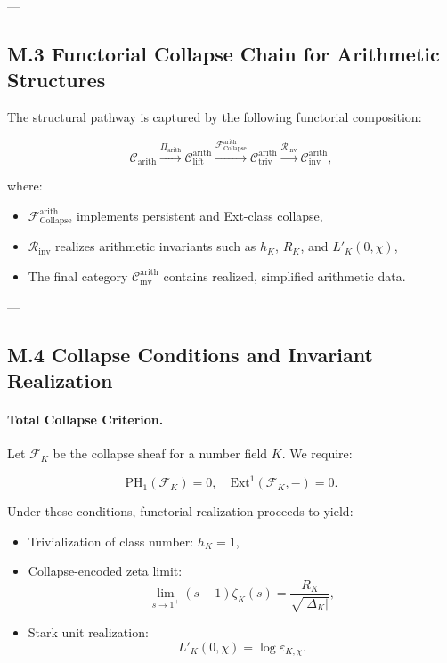\documentclass[11pt]{article}
\begin{document}
---

\subsection*{M.3 Functorial Collapse Chain for Arithmetic Structures}

The structural pathway is captured by the following functorial composition:

\[
\mathcal{C}_{\mathrm{arith}} 
\xrightarrow{\Pi_{\mathrm{arith}}} 
\mathcal{C}_{\mathrm{lift}}^{\mathrm{arith}} 
\xrightarrow{\mathcal{F}_{\mathrm{Collapse}}^{\mathrm{arith}}} 
\mathcal{C}_{\mathrm{triv}}^{\mathrm{arith}} 
\xrightarrow{\mathcal{R}_{\mathrm{inv}}} 
\mathcal{C}_{\mathrm{inv}}^{\mathrm{arith}},
\]

where:
\begin{itemize}
  \item \( \mathcal{F}_{\mathrm{Collapse}}^{\mathrm{arith}} \) implements persistent and Ext-class collapse,
  \item \( \mathcal{R}_{\mathrm{inv}} \) realizes arithmetic invariants such as \( h_K \), \( R_K \), and \( L'_K(0,\chi) \),
  \item The final category \( \mathcal{C}_{\mathrm{inv}}^{\mathrm{arith}} \) contains realized, simplified arithmetic data.
\end{itemize}

---

\subsection*{M.4 Collapse Conditions and Invariant Realization}

\paragraph{Total Collapse Criterion.}
Let \( \mathcal{F}_K \) be the collapse sheaf for a number field \( K \). We require:

\[
\mathrm{PH}_1(\mathcal{F}_K) = 0, \quad \mathrm{Ext}^1(\mathcal{F}_K, -) = 0.
\]

Under these conditions, functorial realization proceeds to yield:
\begin{itemize}
  \item Trivialization of class number: \( h_K = 1 \),
  \item Collapse-encoded zeta limit:
  \[
  \lim_{s \to 1^+} (s - 1)\zeta_K(s) = \dfrac{R_K}{\sqrt{|\Delta_K|}},
  \]
  \item Stark unit realization:
  \[
  L'_K(0,\chi) = \log \varepsilon_{K,\chi}.
  \]
\end{itemize}
\end{document}
